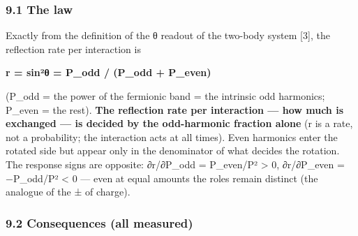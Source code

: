 \documentclass[
]{article}
\begin{document}
\subsubsection{9.1 The law}\label{the-law}

Exactly from the definition of the θ readout of the two-body system
{[}3{]}, the reflection rate per interaction is

\textbf{r = sin²θ = P\_odd / (P\_odd + P\_even)}

(P\_odd = the power of the fermionic band = the intrinsic odd harmonics;
P\_even = the rest). \textbf{The reflection rate per interaction --- how
much is exchanged --- is decided by the odd-harmonic fraction alone} (r
is a rate, not a probability; the interaction acts at all times). Even
harmonics enter the rotated side but appear only in the denominator of
what decides the rotation. The response signs are opposite: ∂r/∂P\_odd =
P\_even/P² \textgreater{} 0, ∂r/∂P\_even = −P\_odd/P² \textless{} 0 ---
even at equal amounts the roles remain distinct (the analogue of the ±
of charge).

\subsubsection{9.2 Consequences (all
measured)}\label{consequences-all-measured}
\end{document}
